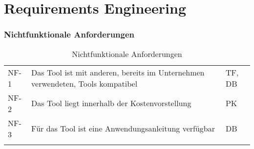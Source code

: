 \chapter{Requirements Engineering}
\label{ch:requirements}


\subsection{Nichtfunktionale Anforderungen}
\label{subsec:nichtfunktional}

\begin{longtable}{lL{10cm}l}
    \toprule
      & 
     & 
                  \\
    \midrule
    \endhead
    NF-1 & Das Tool ist mit anderen, bereits im Unternehmen verwendeten, Tools kompatibel & TF, DB      \\
    \midrule
    NF-2 & Das Tool liegt innerhalb der Kostenvorstellung                                 & PK          \\
    \midrule
    NF-3 & Für das Tool ist eine Anwendungsanleitung verfügbar                            & DB          \\
    \bottomrule
    \caption{Nichtfunktionale Anforderungen}
    \label{tab:nichtfunktional}
\end{longtable}